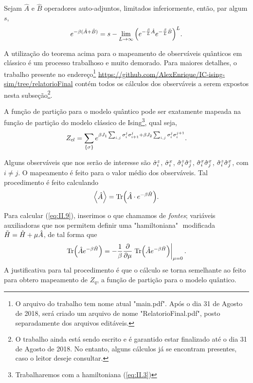 \begin{theorem}
	Sejam $\hat{A}$ e $\hat{B}$ operadores auto-adjuntos, limitados inferiormente, então, par algum $s$, 
	\begin{equation*}
		e^{-\beta(\hat{A} + \hat{B})} = s - \lim_{L \to \infty} \qty(e^{-\frac{\beta}{L} \hat{A}} e^{-\frac{\beta}{L} \hat{B}})^L.
	\end{equation*}
	\label{thm:3}
\end{theorem}

A utilização do teorema acima para o mapeamento de observáveis quânticos em clássico é um processo trabalhoso e muito demorado. Para maiores detalhes, o trabalho presente no endereço\footnote{O arquivo do trabalho tem nome atual "main.pdf". Após o dia 31 de Agosto de 2018, será criado um arquivo de nome "RelatorioFinal.pdf", posto separadamente dos arquivos editáveis.} \url{https://github.com/AlexEnrique/IC-ising-sim/tree/relatorioFinal} contém todos os cálculos dos observáveis a serem expostos nesta subseção\footnote{O trabalho ainda está sendo escrito e é garantido estar finalizado até o dia 31 de Agosto de 2018. No entanto, alguns cálculos já se encontram presentes, caso o leitor deseje consultar.}. 

A função de partição para o modelo quântico pode ser exatamente mapeada na função de partição do modelo clássico de Ising\footnote{Trabalharemos com a hamiltoniana (\ref{eq:II.3})}, qual seja,
\begin{equation*}
	Z_{cl} = \sum_{\{ \sigma \}} e^{\beta J_1 \sum_{i,j} \sigma_i^j \sigma_{i+1}^j + \beta J_2 \sum_{i,j} \sigma_i^j \sigma_i^{j+1}}. 
\end{equation*}

Alguns observáveis que nos serão de interesse são $\hat{\sigma}^z_i$, $\hat{\sigma}^x_i$, $\hat{\sigma}^z_i \hat{\sigma}^z_j$, $\hat{\sigma}^x_i \hat{\sigma}^x_j$, $\hat{\sigma}^z_i \hat{\sigma}^x_j$, com $i \neq j$. O mapeamento é feito para o valor médio dos observáveis. Tal procedimento é feito calculando
\begin{equation}
	\ev{\hat{A}} = \Tr( \hat{A} \cdot e^{-\beta \ham}). 
	\label{eq:II.9}
\end{equation}

Para calcular (\ref{eq:II.9}), inserimos o que chamamos de \textit{fontes}; variáveis auxiliadoras que nos permitem definir uma "hamiltoniana" $ $ modificada $\tilde{H} = \hat{H} + \mu \hat{A}$, de tal forma que 
\begin{equation*}
	\Tr(\hat{A} e^{-\beta \ham}) = -\frac{1}{\beta} \pdv{\mu} \eval{ \Tr(\hat{A} e^{-\beta \tilde{H}})  }_{\mu = 0}. 
\end{equation*}
A justificativa para tal procedimento é que o cálculo se torna semelhante ao feito para obtero mapeamento de $Z_q$, a função de partição para o modelo quântico. 

